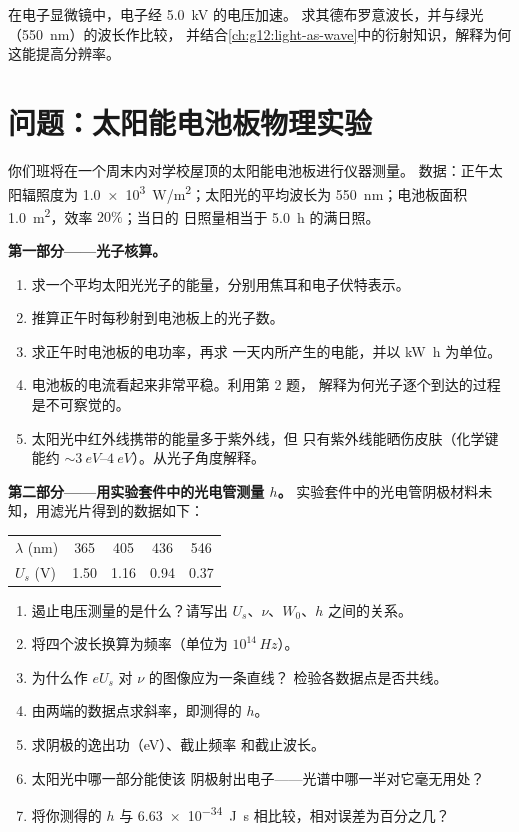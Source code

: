 \begin{exercise}[$\star\star\star$]\label{exo:g12:quantum-world:15}
在电子显微镜中，电子经 \qty{5.0}{kV} 的电压加速。
求其德布罗意波长，并与绿光（\qty{550}{nm}）的波长作比较，
并结合\cref{ch:g12:light-as-wave}中的衍射知识，解释为何这能提高分辨率。
\end{exercise}

\section{问题：太阳能电池板物理实验}

\begin{problem}
\label{pb:g12:quantum-world:1}
你们班将在一个周末内对学校屋顶的太阳能电池板进行仪器测量。
数据：正午太阳辐照度为 \qty{1.0e3}{W/m^2}；太阳光的平均波长为
\qty{550}{nm}；电池板面积 \qty{1.0}{m^2}，效率 $20\%$；当日的
日照量相当于 \qty{5.0}{h} 的满日照。

\medskip
\noindent\textbf{第一部分——光子核算。}
\begin{enumerate}
  \item 求一个平均太阳光光子的能量，分别用焦耳和电子伏特表示。
  \item 推算正午时每秒射到电池板上的光子数。
  \item 求正午时电池板的电功率，再求
        一天内所产生的电能，并以 \unit{kW.h} 为单位。
  \item 电池板的电流看起来非常平稳。利用第 2 题，
        解释为何光子逐个到达的过程是不可察觉的。
  \item 太阳光中红外线携带的能量多于紫外线，但
        只有紫外线能晒伤皮肤（化学键能约 $\sim \qtyrange{3}{4}{eV}$）。从光子角度解释。
\end{enumerate}

\medskip
\noindent\textbf{第二部分——用实验套件中的光电管测量 $h$。}
实验套件中的光电管阴极材料未知，用滤光片得到的数据如下：
\begin{center}\small
\begin{tabular}{lcccc}
$\lambda$ (\unit{nm}) & 365 & 405 & 436 & 546\\
$U_s$ (\unit{V}) & 1.50 & 1.16 & 0.94 & 0.37
\end{tabular}
\end{center}
\begin{enumerate}[resume]
  \item 遏止电压测量的是什么？请写出 $U_s$、$\nu$、$W_0$、$h$ 之间的关系。
  \item 将四个波长换算为频率（单位为 $10^{14}\,\unit{Hz}$）。
  \item 为什么作 $eU_s$ 对 $\nu$ 的图像应为一条直线？
        检验各数据点是否共线。
  \item 由两端的数据点求斜率，即测得的 $h$。
  \item 求阴极的逸出功（\unit{eV}）、截止频率
        和截止波长。
  \item 太阳光中哪一部分能使该
        阴极射出电子——光谱中哪一半对它毫无用处？
  \item 将你测得的 $h$ 与 \qty{6.63e-34}{J.s} 相比较，相对误差为百分之几？
\end{enumerate}


\end{problem}
